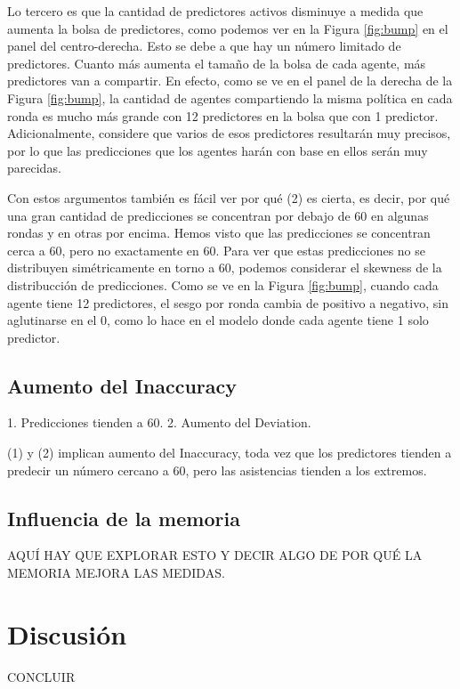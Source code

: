 \documentclass[11pt]{amsart}
\begin{document}
Lo tercero es que la cantidad de predictores activos disminuye a medida que aumenta la bolsa de predictores, como podemos ver en la Figura \ref{fig:bump} en el panel del centro-derecha. Esto se debe a que hay un número limitado de predictores. Cuanto más aumenta el tamaño de la bolsa de cada agente, más predictores van a compartir. En efecto, como se ve en el panel de la derecha de la Figura \ref{fig:bump}, la cantidad de agentes compartiendo la misma política en cada ronda es mucho más grande con 12 predictores en la bolsa que con 1 predictor. Adicionalmente, considere que varios de esos predictores resultarán muy precisos, por lo que las predicciones que los agentes harán con base en ellos serán muy parecidas. 

Con estos argumentos también es fácil ver por qué (2) es cierta, es decir, por qué una gran cantidad de predicciones se concentran por debajo de 60 en algunas rondas y en otras por encima. Hemos visto que las predicciones se concentran cerca a 60, pero no exactamente en 60. Para ver que estas predicciones no se distribuyen simétricamente en torno a 60, podemos considerar el skewness de la distribucción de predicciones. Como se ve en la Figura \ref{fig:bump}, cuando cada agente tiene 12 predictores, el sesgo por ronda cambia de positivo a negativo, sin aglutinarse en el 0, como lo hace en el modelo donde cada agente tiene 1 solo predictor.

\subsection{Aumento del Inaccuracy}
1. Predicciones tienden a 60.
2. Aumento del Deviation.

(1) y (2) implican aumento del Inaccuracy, toda vez que los predictores tienden a predecir un número cercano a 60, pero las asistencias tienden a los extremos.

\subsection{Influencia de la memoria}

AQUÍ HAY QUE EXPLORAR ESTO Y DECIR ALGO DE POR QUÉ LA MEMORIA MEJORA LAS MEDIDAS.

\section{Discusión}\label{sec:disc}

CONCLUIR



\end{document}
